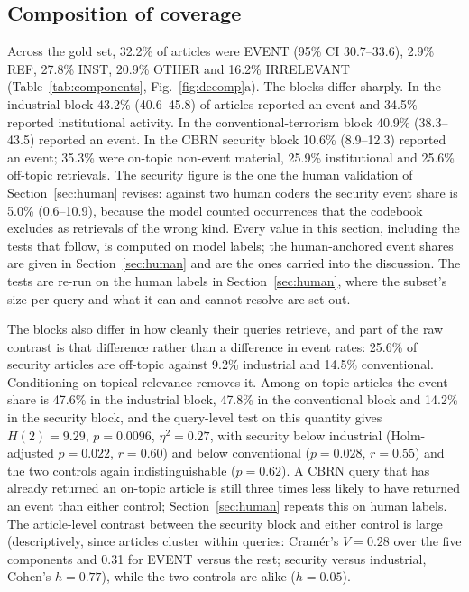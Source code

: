 \documentclass[1p,times]{elsarticle}
\begin{document}
\subsection{Composition of coverage}
\label{sec:composition}
Across the gold set, 32.2\% of articles were EVENT (95\% CI 30.7--33.6), 2.9\% REF, 27.8\% INST, 20.9\% OTHER and 16.2\% IRRELEVANT (Table~\ref{tab:components}, Fig.~\ref{fig:decomp}a). The blocks differ sharply. In the industrial block 43.2\% (40.6--45.8) of articles reported an event and 34.5\% reported institutional activity. In the conventional-terrorism block 40.9\% (38.3--43.5) reported an event. In the CBRN security block 10.6\% (8.9--12.3) reported an event; 35.3\% were on-topic non-event material, 25.9\% institutional and 25.6\% off-topic retrievals. The security figure is the one the human validation of Section~\ref{sec:human} revises: against two human coders the security event share is 5.0\% (0.6--10.9), because the model counted occurrences that the codebook excludes as retrievals of the wrong kind. Every value in this section, including the tests that follow, is computed on model labels; the human-anchored event shares are given in Section~\ref{sec:human} and are the ones carried into the discussion. The tests are re-run on the human labels in Section~\ref{sec:human}, where the subset's size per query and what it can and cannot resolve are set out.

The blocks also differ in how cleanly their queries retrieve, and part of the raw contrast is that difference rather than a difference in event rates: 25.6\% of security articles are off-topic against 9.2\% industrial and 14.5\% conventional. Conditioning on topical relevance removes it. Among on-topic articles the event share is 47.6\% in the industrial block, 47.8\% in the conventional block and 14.2\% in the security block, and the query-level test on this quantity gives $H(2) = 9.29$, $p = 0.0096$, $\eta^2 = 0.27$, with security below industrial (Holm-adjusted $p = 0.022$, $r = 0.60$) and below conventional ($p = 0.028$, $r = 0.55$) and the two controls again indistinguishable ($p = 0.62$). A CBRN query that has already returned an on-topic article is still three times less likely to have returned an event than either control; Section~\ref{sec:human} repeats this on human labels. The article-level contrast between the security block and either control is large (descriptively, since articles cluster within queries: Cram\'er's $V = 0.28$ over the five components and 0.31 for EVENT versus the rest; security versus industrial, Cohen's $h = 0.77$), while the two controls are alike ($h = 0.05$).
\end{document}

